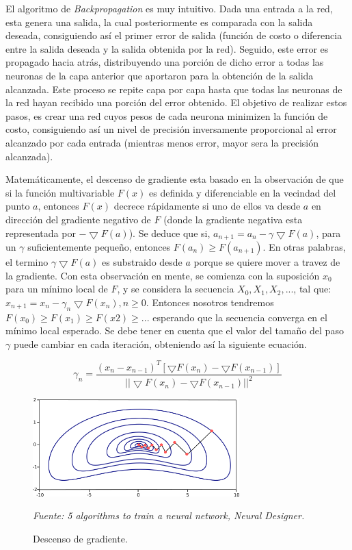 El algoritmo de \textit{Backpropagation} es muy intuitivo. Dada una entrada a la red, esta genera una salida, la cual posteriormente es comparada con la salida deseada, consiguiendo así el primer error de salida (función de costo o diferencia entre la salida deseada y la salida obtenida por la red). Seguido, este error es propagado hacia atrás, distribuyendo una porción de dicho error a todas las neuronas de la capa anterior que aportaron para la obtención de la salida alcanzada. Este proceso se repite capa por capa hasta que todas las neuronas de la red hayan recibido una porción del error obtenido. El objetivo de realizar estos pasos, es crear una red cuyos pesos de cada neurona minimizen la función de costo, consiguiendo así un nivel de precisión inversamente proporcional al error alcanzado por cada entrada (mientras menos error, mayor sera la precisión alcanzada).

Matemáticamente, el descenso de gradiente esta basado en la observación de que si la función multivariable $F(x)$ es definida y  diferenciable en la vecindad del punto $a$, entonces $F(x)$ decrece rápidamente si uno de ellos va desde $a$ en dirección del gradiente negativo de $F$ (donde la gradiente negativa esta representada por $-\bigtriangledown F(a)$). Se deduce que si, $a_{n+1} = a_n - \gamma \bigtriangledown F(a)$, para un $\gamma$ suficientemente pequeño, entonces $F(a_n)\geq F(a_{n+1})$. En otras palabras, el termino $\gamma \bigtriangledown F(a)$ es substraido desde $a$ porque se quiere mover a travez de la gradiente.  Con esta observación en mente,  se comienza con la suposición $x_0$ para un mínimo local de $F$, y se considera la secuencia $X_0, X_1, X_2,...$, tal que: $x_{n+1} = x_n - \gamma_n \bigtriangledown F(x_n), n\geq0$. Entonces nosotros tendremos $F(x_0)\geq F(x_1) \geq F(x2) \geq ...$ esperando que la secuencia converga en el mínimo local esperado. Se debe tener en cuenta que el valor del tamaño del paso $\gamma$ puede cambiar en cada iteración, obteniendo así la siguiente ecuación.

\begin{equation}
\gamma_n=\frac{(x_n - x_{n-1})^T [\bigtriangledown F(x_n)-\bigtriangledown F(x_{n-1})]}{||\bigtriangledown F(x_n)-\bigtriangledown F(x_{n-1})||^2}
\end{equation}
\begin{figure}[H]
		\centering
		\includegraphics[width=80mm]{Imagenes/back_propagation.png}
		\caption{Descenso de gradiente.}
		\vspace{0.15cm}
		\textit{Fuente: 5 algorithms to train a neural network, Neural Designer.}
		\label{fig:back_propagation}
\end{figure}


